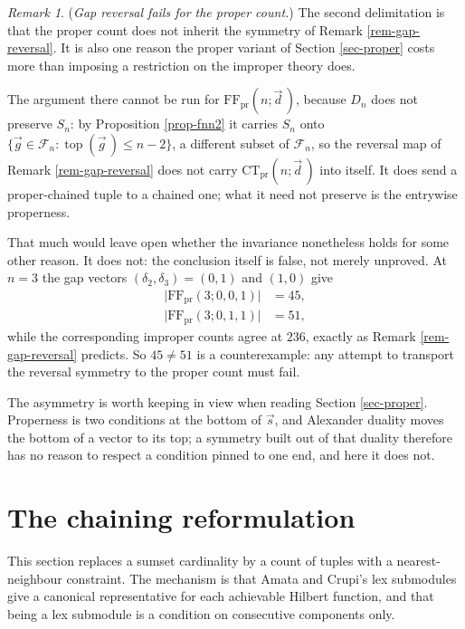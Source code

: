 \documentclass[11pt, a4paper, abstract=yes]{scrartcl}
\theoremstyle{definition}
\theoremstyle{remark}
\newtheorem{remark}[definition]{Remark}
\theoremstyle{plain}
\newcommand{\tp}{\operatorname{top}}
\begin{document}
\begin{remark}
(\emph{Gap reversal fails for the proper count.}) The second delimitation is that the proper count does
not inherit the symmetry of Remark \ref{rem-gap-reversal}. It is also one reason the proper variant of
Section \ref{sec-proper} costs more than imposing a restriction on the improper theory does.

The argument there cannot be run for \(\mathrm{FF}_{\mathrm{pr}}(n;\vec d\,)\), because \(D_n\) does not
preserve \(S_n\): by Proposition \ref{prop-fnn2} it carries \(S_n\) onto
\(\lbrace\vec g\in\mathcal F_n:\tp(\vec g\,)\le n-2\rbrace\), a different subset of \(\mathcal F_n\), so
the reversal map of Remark \ref{rem-gap-reversal} does not carry \(\mathrm{CT}_{\mathrm{pr}}(n;\vec d\,)\)
into itself. It does send a proper-chained tuple to a chained one; what it need not preserve is the
entrywise properness.

That much would leave open whether the invariance nonetheless holds for some other reason. It does
not: the conclusion itself is false, not merely unproved. At \(n=3\) the gap vectors
\((\delta_2,\delta_3)=(0,1)\) and \((1,0)\) give
\begin{align}
  \lvert\mathrm{FF}_{\mathrm{pr}}(3;0,0,1)\rvert &= 45,\label{eq:proper-not-reversible}\\
  \lvert\mathrm{FF}_{\mathrm{pr}}(3;0,1,1)\rvert &= 51,\label{eq:proper-not-reversible-b}
\end{align}
while the corresponding improper counts agree at \(236\), exactly as Remark
\ref{rem-gap-reversal} predicts. So \(45\ne51\) is a counterexample: any attempt to transport the
reversal symmetry to the proper count must fail.

The asymmetry is worth keeping in view when reading Section \ref{sec-proper}. Properness is two
conditions at the bottom of \(\vec s\), and Alexander duality moves the bottom of a vector to its
top; a symmetry built out of that duality therefore has no reason to respect a condition pinned to
one end, and here it does not.
\label{rem-proper-not-reversible}
\end{remark}
\section{The chaining reformulation}
\label{sec-chaining}
This section replaces a sumset cardinality by a count of tuples with a nearest-neighbour constraint.
The mechanism is that Amata and Crupi's lex submodules give a canonical representative for each
achievable Hilbert function, and that being a lex submodule is a condition on consecutive components
only.
\end{document}
